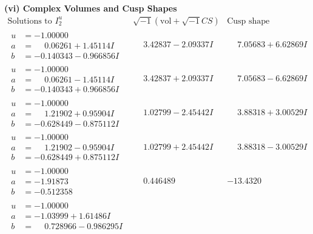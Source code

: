 \documentclass[1p]{elsarticle_modified}
\theoremstyle{definition}
\newcommand{\I}{\sqrt{-1}}
\begin{document}
\newpage\flushleft \textbf{(vi) Complex Volumes and Cusp Shapes}
$$\begin{array}{c|c|c}  
\text{Solutions to }I^u_{2}& \I (\text{vol} + \sqrt{-1}CS) & \text{Cusp shape}\\
 \hline 
\begin{aligned}
u &= -1.00000\phantom{ +0.000000I} \\
a &= \phantom{-}0.06261 + 1.45114 I \\
b &= -0.140343 - 0.966856 I\end{aligned}
 & \phantom{-}3.42837 - 2.09337 I & \phantom{-}7.05683 + 6.62869 I \\ \hline\begin{aligned}
u &= -1.00000\phantom{ +0.000000I} \\
a &= \phantom{-}0.06261 - 1.45114 I \\
b &= -0.140343 + 0.966856 I\end{aligned}
 & \phantom{-}3.42837 + 2.09337 I & \phantom{-}7.05683 - 6.62869 I \\ \hline\begin{aligned}
u &= -1.00000\phantom{ +0.000000I} \\
a &= \phantom{-}1.21902 + 0.95904 I \\
b &= -0.628449 - 0.875112 I\end{aligned}
 & \phantom{-}1.02799 - 2.45442 I & \phantom{-}3.88318 + 3.00529 I \\ \hline\begin{aligned}
u &= -1.00000\phantom{ +0.000000I} \\
a &= \phantom{-}1.21902 - 0.95904 I \\
b &= -0.628449 + 0.875112 I\end{aligned}
 & \phantom{-}1.02799 + 2.45442 I & \phantom{-}3.88318 - 3.00529 I \\ \hline\begin{aligned}
u &= -1.00000\phantom{ +0.000000I} \\
a &= -1.91873\phantom{ +0.000000I} \\
b &= -0.512358\phantom{ +0.000000I}\end{aligned}
 & \phantom{-}0.446489\phantom{ +0.000000I} & -13.4320\phantom{ +0.000000I} \\ \hline\begin{aligned}
u &= -1.00000\phantom{ +0.000000I} \\
a &= -1.03999 + 1.61486 I \\
b &= \phantom{-}0.728966 - 0.986295 I\end{aligned}

\end{array}$$
\end{document}
